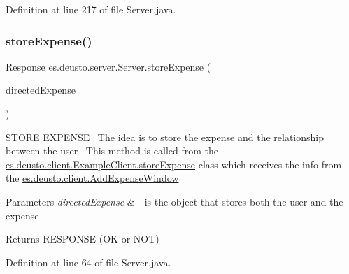 Definition at line 217 of file Server.\+java.

\mbox{\label{classes_1_1deusto_1_1server_1_1_server_a1a91c5bde8d3b39fc4292dc09d62b61b}} 
\subsubsection{\texorpdfstring{store\+Expense()}{storeExpense()}}
{\footnotesize\ttfamily Response es.\+deusto.\+server.\+Server.\+store\+Expense (\begin{DoxyParamCaption}\item[{\hyperlink{classes_1_1deusto_1_1serialization_1_1_directed_message}{Directed\+Message}}]{directed\+Expense }\end{DoxyParamCaption})}

S\+T\+O\+RE E\+X\+P\+E\+N\+SE~\newline
The idea is to store the expense and the relationship between the user~\newline
 This method is called from the \hyperlink{classes_1_1deusto_1_1client_1_1_example_client_aba5fe3dfb882ef22d0bd49b5915871d3}{es.\+deusto.\+client.\+Example\+Client.\+store\+Expense} class which receives the info from the \hyperlink{classes_1_1deusto_1_1client_1_1_add_expense_window}{es.\+deusto.\+client.\+Add\+Expense\+Window}~\newline

\begin{DoxyParams}{Parameters}
{\em directed\+Expense} & -\/ is the object that stores both the user and the expense \\
\hline
\end{DoxyParams}
\begin{DoxyReturn}{Returns}
R\+E\+S\+P\+O\+N\+SE (OK or N\+OT) 
\end{DoxyReturn}


Definition at line 64 of file Server.\+java.

\mbox{\label{classes_1_1deusto_1_1server_1_1_server_a6e5f5013058ddaf970b0b21da2e32f66}} 

